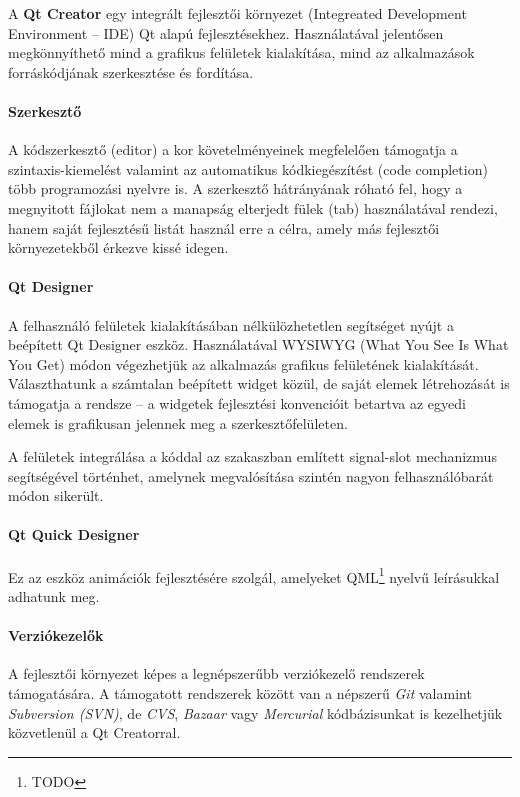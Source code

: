 A \textbf{Qt Creator} egy integrált fejlesztői környezet (Integreated Development Environment -- IDE) Qt alapú fejlesztésekhez. Használatával jelentősen megkönnyíthető mind a grafikus felületek kialakítása, mind az alkalmazások forráskódjának szerkesztése és fordítása.

\paragraph{Szerkesztő}

A kódszerkesztő (editor) a kor követelményeinek megfelelően támogatja a szintaxis-kiemelést valamint az automatikus kódkiegészítést (code completion) több programozási nyelvre is. A szerkesztő hátrányának róható fel, hogy a megnyitott fájlokat nem a manapság elterjedt fülek (tab) használatával rendezi, hanem saját fejlesztésű listát használ erre a célra, amely más fejlesztői környezetekből érkezve kissé idegen.

\paragraph{Qt Designer}

A felhasználó felületek kialakításában nélkülözhetetlen segítséget nyújt a beépített Qt Designer eszköz. Használatával WYSIWYG (What You See Is What You Get) módon végezhetjük az alkalmazás grafikus felületének kialakítását. Választhatunk a számtalan beépített widget közül, de saját elemek létrehozását is támogatja a rendsze -- a widgetek fejlesztési konvencióit betartva az egyedi elemek is grafikusan jelennek meg a szerkesztőfelületen.

A felületek integrálása a kóddal az  szakaszban említett signal-slot mechanizmus segítségével történhet, amelynek megvalósítása szintén nagyon felhasználóbarát módon sikerült.

\paragraph{Qt Quick Designer}

Ez az eszköz animációk fejlesztésére szolgál, amelyeket QML\footnote{TODO} nyelvű leírásukkal adhatunk meg.

\paragraph{Verziókezelők}

A fejlesztői környezet képes a legnépszerűbb verziókezelő rendszerek támogatására. A támogatott rendszerek között van a népszerű \emph{Git} valamint \emph{Subversion (SVN)}, de \emph{CVS}, \emph{Bazaar} vagy \emph{Mercurial} kódbázisunkat is kezelhetjük közvetlenül a Qt Creatorral.

